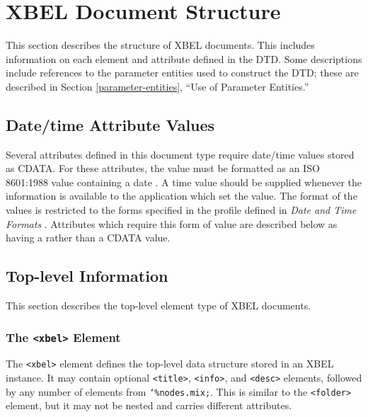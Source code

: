 \documentclass{howto}
\newcommand{\element}[1]{\texttt{<#1>}}
\newcommand{\paramentity}[1]{\texttt{\char`\%#1;}}
\begin{document}
\section{XBEL Document Structure
         \label{document-structure}}

  This section describes the structure of XBEL documents.  This
  includes information on each element and attribute defined in the
  DTD.  Some descriptions include references to the parameter entities 
  used to construct the DTD; these are described in Section
  \ref{parameter-entities}, ``Use of Parameter Entities.''

  \subsection{Date/time Attribute Values
              \label{date-time}}

    Several attributes defined in this document type require date/time
    values stored as CDATA.  For these attributes, the value must be
    formatted as an ISO 8601:1988 value containing a date
    \cite{iso8601,iso8601-houston,iso8601-kuhn}.  A time value
    should be supplied whenever the information is available to the
    application which set the value.  The format of the values is
    restricted to the forms specified in the profile defined in
    \emph{Date and Time Formats} \cite{w3c-datetime}.  Attributes
    which require this form of value are described below as having a
     rather than a CDATA value.

  \subsection{Top-level Information
              \label{top-level}}

    This section describes the top-level element type of XBEL
    documents.

    \subsubsection{The \element{xbel} Element
                   \label{element-xbel}}

      The \element{xbel} element defines the top-level data structure
      stored in an XBEL instance.  It may contain optional
      \element{title}, \element{info}, and \element{desc} elements,
      followed by any number of elements from
      \paramentity{nodes.mix}.  This is similar to the
      \element{folder} element, but it may not be nested and carries
      different attributes.
\end{document}
